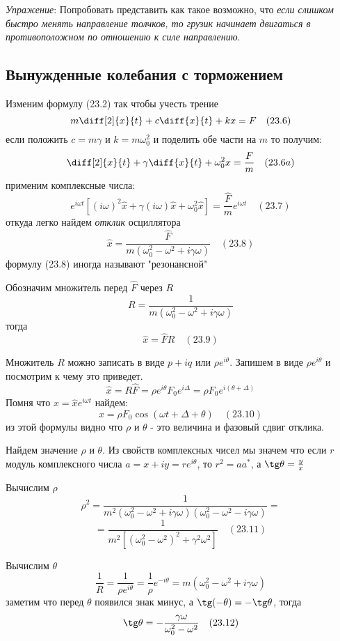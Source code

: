 \documentclass[12pt]{article}
\begin{document}
\textit{Упражение}: Попробовать представить как такое возможно, что \textit{если слишком быстро менять направление толчков, то грузик начинает двигаться в противоположном по отношению к силе направлению}.

\subsection{Вынужденные колебания с торможением}

Изменим формулу (23.2) так чтобы учесть трение
\[
    m \diff[2]{x}{t} + c \diff{x}{t} + kx = F \quad (23.6)
\]
если положить $c=m\gamma$ и $k=m\omega_0^2$ и поделить обе части на $m$ то получим:
\[
    \diff[2]{x}{t} + \gamma \diff{x}{t} + \omega_0^2 x = \frac{F}{m} \quad (23.6a)
\]
применим комплексные числа:
\[
    e^{i\omega t}[(i\omega)^2 \hat{x} + \gamma(i\omega)\hat{x} + \omega_0^2 \hat{x}] = \frac{\hat
    F}{m} e^{i\omega t} \quad (23.7)
\]
откуда легко найдем \textit{отклик} осциллятора
\[
    \hat{x}=\frac{\hat{F}}{m(\omega_0^2-\omega^2+i\gamma\omega)} \quad (23.8)    
\]
формулу (23.8) иногда называют "резонансной"

\medskip

Обозначим множитель перед \(\hat{F}\) через \(R\)
\[
    R=\frac{1}{m(\omega_0^2-\omega^2+i\gamma\omega)}
\]
тогда
\[
    \hat{x}=\hat{F}R \quad (23.9) 
\]

\medbreak

Множитель \(R\) можно записать в виде \(p+iq\) или \(\rho e^{i \theta}\). Запишем в виде \(\rho e^{i \theta}\) и посмотрим к чему это приведет.
\[
    \hat{x}=R\hat{F}=\rho e^{i\theta} F_0e^{i \Delta}=\rho F_0e^{i (\theta+\Delta)}
\]
Помня что \(x=\hat{x}e^{i \omega t}\) найдем:
\[
    x=\rho F_0 \cos(\omega t + \Delta + \theta) \quad (23.10)
\]
из этой формулы видно что \(\rho\) и \(\theta\) - это величина и фазовый сдвиг отклика.

\medbreak

Найдем значение \(\rho\) и \(\theta\). Из свойств комплексных чисел мы значем что если \(r\) модуль комплексного числа \(a=x+iy=r e^{i \theta}\), то \(r^2=aa^*\), а \(\tg \theta = \frac{y}{x} \)

Вычислим \(\rho\)
\[
    \rho^2 = \frac{1}{m^2(\omega_0^2-\omega^2+i\gamma\omega)(\omega_0^2-\omega^2-i\gamma\omega)} =
\]
\[
    = \frac{1}{m^2[(\omega_0^2-\omega^2)^2+\gamma^2\omega^2]} \quad (23.11)
\]

Вычислим \(\theta\)
\[
    \frac{1}{R} = \frac{1}{\rho e^{i \theta}} = \frac{1}{\rho}e^{- i \theta} = m(\omega_0^2-\omega^2+i\gamma\omega)
\]
заметим что перед \(\theta\) появился знак минус, а \( \tg (-\theta)=-\tg \theta \), тогда
\[
    \tg \theta = -\frac{\gamma\omega}{\omega_0^2-\omega^2} \quad (23.12)
\]
\end{document}
